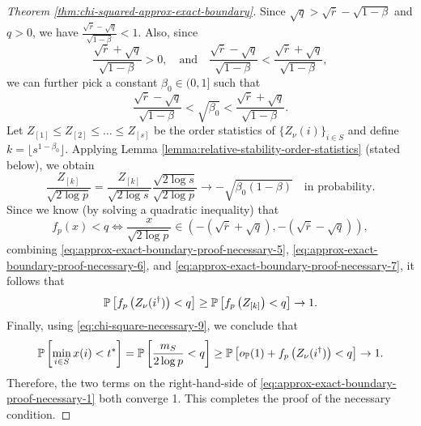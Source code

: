 \begin{proof}[Theorem \ref{thm:chi-squared-approx-exact-boundary}]
Since $\sqrt{q}>\sqrt{\overline{r}}-\sqrt{1-\beta}$ and $q>0$, we have
$\frac{\sqrt{\overline{r}}-\sqrt{q}}{\sqrt{1-\beta}}<1$.
Also, since
$$
    \frac{\sqrt{\overline{r}}+\sqrt{q}}{\sqrt{1-\beta}}>0,
    \quad\text{and}\quad
    \frac{\sqrt{\overline{r}}-\sqrt{q}}{\sqrt{1-\beta}} < \frac{\sqrt{\overline{r}}+\sqrt{q}}{\sqrt{1-\beta}},
$$
we can further pick a constant $\beta_0\in(0,1]$ such that
\begin{equation} \label{eq:approx-exact-boundary-proof-necessary-5}
    \frac{\sqrt{\overline{r}}-\sqrt{q}}{\sqrt{1-\beta}} 
    < \sqrt{\beta_0} < 
    \frac{\sqrt{\overline{r}}+\sqrt{q}}{\sqrt{1-\beta}}.
\end{equation}
Let $Z_{[1]}\le Z_{[2]}\le\ldots\le Z_{[s]}$ be the order statistics of 
$\{Z_\nu(i)\}_{i\in S}$ and define $k=\lfloor s^{1-\beta_0}\rfloor$.
Applying Lemma \ref{lemma:relative-stability-order-statistics} (stated below), we obtain
\begin{equation} \label{eq:approx-exact-boundary-proof-necessary-6}
    \frac{Z_{[k]}}{\sqrt{2\log{p}}}
    = \frac{Z_{[k]}}{\sqrt{2\log{s}}} \frac{\sqrt{2\log{s}}}{\sqrt{2\log{p}}} 
    \to -\sqrt{\beta_0(1-\beta)}
    \quad\text{in probability}.
\end{equation}
Since we know (by solving a quadratic inequality) that
\begin{equation} \label{eq:approx-exact-boundary-proof-necessary-7}
    f_p(x)<q \iff \frac{x}{\sqrt{2\log{p}}} \in \left(-(\sqrt{\overline{r}}+\sqrt{q}), -(\sqrt{\overline{r}}-\sqrt{q})\right),
\end{equation}
combining \eqref{eq:approx-exact-boundary-proof-necessary-5}, \eqref{eq:approx-exact-boundary-proof-necessary-6}, and 
\eqref{eq:approx-exact-boundary-proof-necessary-7}, it follows that
\begin{equation*}
    \P\left[ f_p\left(Z_\nu(i^\dagger)\right) < q \right] \ge \P\left[ f_p\left(Z_{[k]}\right) < q \right] \to 1.
\end{equation*}
Finally, using \eqref{eq:chi-square-necessary-9}, we conclude that 
$$
\P\left[\min_{i\in S}x(i)<t^*\right] = 
\P\left[\frac{m_{S}}{2\log{p}} < q\right] \ge
\P\left[o_\P(1) + f_p\left(Z_\nu(i^\dagger)\right) < q \right] \to 1.
$$
Therefore, the two terms on the right-hand-side of \eqref{eq:approx-exact-boundary-proof-necessary-1} both converge 1. 
This completes the proof of the necessary condition.
\end{proof}

